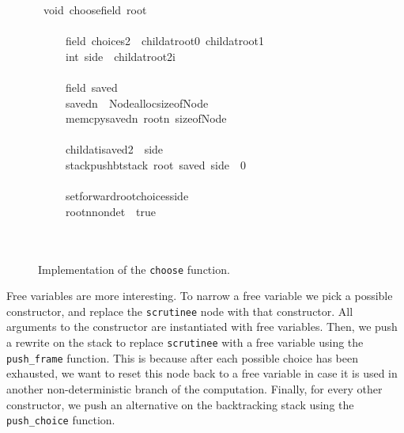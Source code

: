 \documentclass{book}
\theoremstyle{definition}
\begin{document}
\begin{figure}
\begin{tabbing}\ttfamily
~void~choosefield~root\\
\ttfamily ~\\
\ttfamily ~~~~~field~choices2~~childatroot0~childatroot1\\
\ttfamily ~~~~~int~side~~childatroot2i\\
\ttfamily ~\\
\ttfamily ~~~~~field~saved\\
\ttfamily ~~~~~savedn~~NodeallocsizeofNode\\
\ttfamily ~~~~~memcpysavedn~rootn~sizeofNode\\
\ttfamily ~\\
\ttfamily ~~~~~childatisaved2~~side\\
\ttfamily ~~~~~stackpushbtstack~root~saved~side~~0\\
\ttfamily ~\\
\ttfamily ~~~~~setforwardrootchoicesside\\
\ttfamily ~~~~~rootnnondet~~true\\
\ttfamily ~\\
\ttfamily ~
\end{tabbing}
\caption{Implementation of the \texttt{choose} function.}
\label{fig:choose}
\end{figure}

Free variables are more interesting.
To narrow a free variable we pick a possible constructor,
and replace the \texttt{scrutinee} node with that constructor.
All arguments to the constructor are instantiated with free variables.
Then, we push a rewrite on the stack to replace \texttt{scrutinee} with a free variable
using the \texttt{push\_frame} function.
This is because after each possible choice has been exhausted, we want to reset
this node back to a free variable in case it is used in another non-deterministic branch
of the computation.
Finally, for every other constructor, we push an alternative on the backtracking stack
using the \texttt{push\_choice} function.
\end{document}
